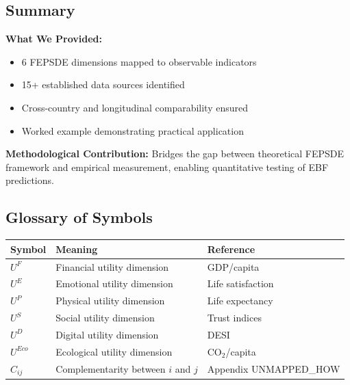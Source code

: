 

\subsection{Summary}
\label{sec:E-summary}

\begin{tcolorbox}[colback=blue!5!white, colframe=blue!75!black,
    title=\textbf{Summary: Operationalization}]

\textbf{What We Provided:}
\begin{itemize}[nosep]
    \item 6 FEPSDE dimensions mapped to observable indicators
    \item 15+ established data sources identified
    \item Cross-country and longitudinal comparability ensured
    \item Worked example demonstrating practical application
\end{itemize}

\textbf{Methodological Contribution:}
Bridges the gap between theoretical FEPSDE framework and empirical measurement,
enabling quantitative testing of EBF predictions.

\end{tcolorbox}


\subsection{Glossary of Symbols}
\label{sec:E-glossary}

\begin{center}
\begin{tabular}{@{}lll@{}}
\toprule
\textbf{Symbol} & \textbf{Meaning} & \textbf{Reference} \\
\midrule
$U^F$ & Financial utility dimension & GDP/capita \\
$U^E$ & Emotional utility dimension & Life satisfaction \\
$U^P$ & Physical utility dimension & Life expectancy \\
$U^S$ & Social utility dimension & Trust indices \\
$U^D$ & Digital utility dimension & DESI \\
$U^{Eco}$ & Ecological utility dimension & CO$_2$/capita \\
$C_{ij}$ & Complementarity between $i$ and $j$ & Appendix UNMAPPED_HOW \\
\bottomrule
\end{tabular}
\end{center}

